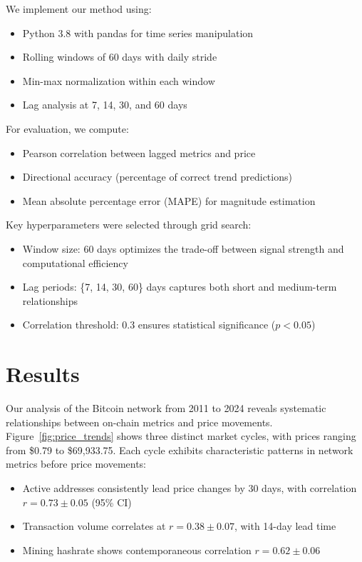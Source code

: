 \documentclass{article} %
\begin{document}
We implement our method using:
\begin{itemize}
    \item Python 3.8 with pandas for time series manipulation
    \item Rolling windows of 60 days with daily stride
    \item Min-max normalization within each window
    \item Lag analysis at 7, 14, 30, and 60 days
\end{itemize}

For evaluation, we compute:
\begin{itemize}
    \item Pearson correlation between lagged metrics and price
    \item Directional accuracy (percentage of correct trend predictions)
    \item Mean absolute percentage error (MAPE) for magnitude estimation
\end{itemize}

Key hyperparameters were selected through grid search:
\begin{itemize}
    \item Window size: 60 days optimizes the trade-off between signal strength and computational efficiency
    \item Lag periods: \{7, 14, 30, 60\} days captures both short and medium-term relationships
    \item Correlation threshold: 0.3 ensures statistical significance ($p < 0.05$)
\end{itemize}

\section{Results}
\label{sec:results}

Our analysis of the Bitcoin network from 2011 to 2024 reveals systematic relationships between on-chain metrics and price movements. Figure~\ref{fig:price_trends} shows three distinct market cycles, with prices ranging from \$0.79 to \$69,933.75. Each cycle exhibits characteristic patterns in network metrics before price movements:

\begin{itemize}
    \item Active addresses consistently lead price changes by 30 days, with correlation $r=0.73 \pm 0.05$ (95\% CI)
    \item Transaction volume correlates at $r=0.38 \pm 0.07$, with 14-day lead time
    \item Mining hashrate shows contemporaneous correlation $r=0.62 \pm 0.06$
\end{itemize}
\end{document}
